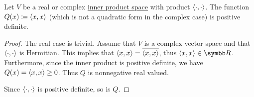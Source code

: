 \begin{lemma}\label{thm:inner_product_quadratic_form_is_positive_definite}
  Let \( V \) be a real or complex \hyperref[def:inner_product_space]{inner product space} with product \( \left\langle \cdot, \cdot \right\rangle \). The function \( Q(x) \coloneqq \left\langle x, x \right\rangle \) (which is not a quadratic form in the complex case) is positive definite.
\end{lemma}
\begin{proof}
  The real case is trivial. Assume that \( V \) is a complex vector space and that \( \left\langle \cdot, \cdot \right\rangle \) is Hermitian. This implies that \( \left\langle x, x \right\rangle = \overline{\left\langle x, x \right\rangle} \), thus \( \Prod x x \in \BR \). Furthermore, since the inner product is positive definite, we have \( Q(x) = \left\langle x, x \right\rangle \geq 0 \). Thus \( Q \) is nonnegative real valued.

  Since \( \left\langle \cdot, \cdot \right\rangle \) is positive definite, so is \( Q \).
\end{proof}

